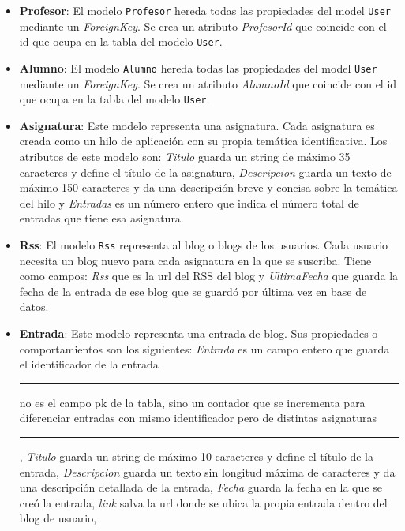 \documentclass[a4paper, 12pt]{book}
\begin{document}
\begin{itemize}
  \texttt{User} contendr\'a todos los usuarios de aplicaci\'on previamente registrados, y ninguno de \'estos podr\'a coincidir con otro en nombre de usuario
  puesto que en la p\'agina de registro se aplica un filtro al introducir el dato \textit{Username}.
  \item {\bfseries Profesor}: El modelo \texttt{Profesor} hereda todas las propiedades del model \texttt{User} mediante un \textit{ForeignKey}. Se crea un
  atributo \textit{ProfesorId} que coincide con el id que ocupa en la tabla del modelo \texttt{User}.
  \item {\bfseries Alumno}: El modelo \texttt{Alumno} hereda todas las propiedades del model \texttt{User} mediante un \textit{ForeignKey}. Se crea un
  atributo \textit{AlumnoId} que coincide con el id que ocupa en la tabla del modelo \texttt{User}.
  \item {\bfseries Asignatura}: Este modelo representa una asignatura. Cada asignatura es creada como un hilo de aplicaci\'on con su propia tem\'atica
  identificativa. Los atributos de este modelo son: \textit{Titulo} guarda un string de m\'aximo 35 caracteres y define el t\'itulo de la asignatura, 
  \textit{Descripcion} guarda un texto de m\'aximo 150 caracteres y da una descripci\'on breve y concisa sobre la tem\'atica del hilo y \textit{Entradas} 
  es un n\'umero entero que indica el n\'umero total de entradas que tiene esa asignatura.
  \item {\bfseries Rss}: El modelo \texttt{Rss} representa al blog o blogs de los usuarios. Cada usuario necesita un blog nuevo para cada asignatura en la
  que se suscriba. Tiene como campos: \textit{Rss} que es la url del RSS del blog y \textit{UltimaFecha} que guarda la fecha de la entrada de ese blog 
  que se guard\'o por \'ultima vez en base de datos.
  \item {\bfseries Entrada}: Este modelo representa una entrada de blog. Sus propiedades o comportamientos son los siguientes: \textit{Entrada} es un campo 
  entero que guarda el identificador de la entrada \rule[1mm]{4mm}{0.1mm}no es el campo pk de la tabla, sino un contador que se incrementa para diferenciar
  entradas con mismo identificador pero de distintas asignaturas\rule[1mm]{4mm}{0.1mm}, \textit{Titulo} guarda un string de m\'aximo 10 caracteres y define 
  el t\'itulo de la entrada, \textit{Descripcion} guarda un texto sin longitud m\'axima de caracteres y da una descripci\'on detallada de la entrada,
  \textit{Fecha} guarda la fecha en la que se cre\'o la entrada, \textit{link} salva la url donde se ubica la propia entrada dentro del blog de usuario, 

\end{itemize}
\end{document}
